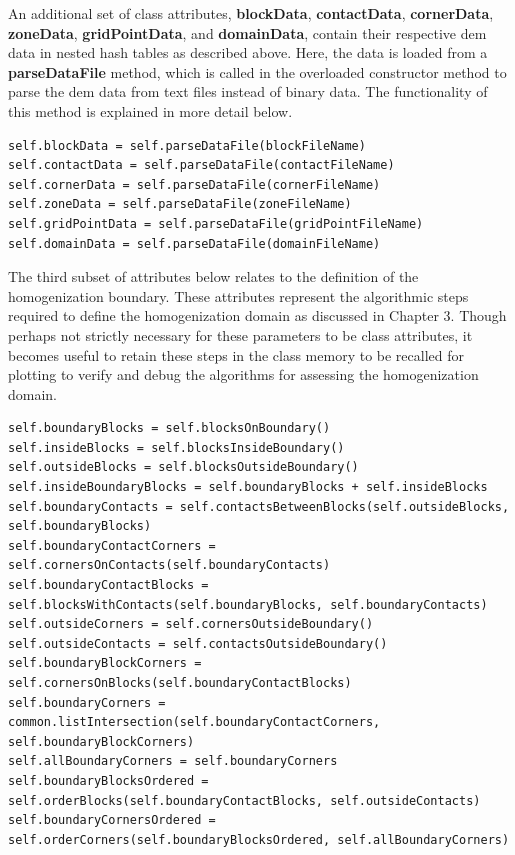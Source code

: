 An additional set of class attributes, \textbf{blockData}, \textbf{contactData}, \textbf{cornerData}, \textbf{zoneData}, \textbf{gridPointData}, and \textbf{domainData}, contain their respective \acrshort{dem} data in nested hash tables as described above. Here, the data is loaded from a \textbf{parseDataFile} method, which is called in the overloaded constructor method to parse the \acrshort{dem} data from text files instead of binary data. The functionality of this method is explained in more detail below.

\begin{lstlisting}[frame=single] 
self.blockData = self.parseDataFile(blockFileName)
self.contactData = self.parseDataFile(contactFileName)
self.cornerData = self.parseDataFile(cornerFileName)
self.zoneData = self.parseDataFile(zoneFileName)
self.gridPointData = self.parseDataFile(gridPointFileName)
self.domainData = self.parseDataFile(domainFileName)
\end{lstlisting}

The third subset of attributes below relates to the definition of the homogenization boundary. These attributes represent the algorithmic steps required to define the homogenization domain as discussed in Chapter 3. Though perhaps not strictly necessary for these parameters to be class attributes, it becomes useful to retain these steps in the class memory to be recalled for plotting to verify and debug the algorithms for assessing the homogenization domain.

\begin{lstlisting}[frame=single] 
self.boundaryBlocks = self.blocksOnBoundary()
self.insideBlocks = self.blocksInsideBoundary()
self.outsideBlocks = self.blocksOutsideBoundary()
self.insideBoundaryBlocks = self.boundaryBlocks + self.insideBlocks
self.boundaryContacts = self.contactsBetweenBlocks(self.outsideBlocks, self.boundaryBlocks)
self.boundaryContactCorners = self.cornersOnContacts(self.boundaryContacts)
self.boundaryContactBlocks = self.blocksWithContacts(self.boundaryBlocks, self.boundaryContacts)
self.outsideCorners = self.cornersOutsideBoundary()
self.outsideContacts = self.contactsOutsideBoundary()
self.boundaryBlockCorners = self.cornersOnBlocks(self.boundaryContactBlocks)
self.boundaryCorners = common.listIntersection(self.boundaryContactCorners, self.boundaryBlockCorners)
self.allBoundaryCorners = self.boundaryCorners
self.boundaryBlocksOrdered = self.orderBlocks(self.boundaryContactBlocks, self.outsideContacts)
self.boundaryCornersOrdered = self.orderCorners(self.boundaryBlocksOrdered, self.allBoundaryCorners)
\end{lstlisting}

